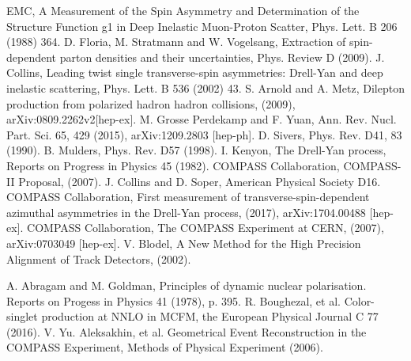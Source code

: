 \begin{thebibliography}{99}

  
 EMC, A Measurement of the Spin Asymmetry and
  Determination of the Structure Function g1 in Deep Inelastic
  Muon-Proton Scatter, Phys. Lett. B 206 (1988) 364.
 D. Floria, M. Stratmann and
  W. Vogelsang, Extraction of spin-dependent parton densities and
  their uncertainties, Phys. Review D (2009).
 J. Collins, Leading twist single
  transverse-spin asymmetries: Drell-Yan and deep inelastic
  scattering, Phys. Lett. B 536 (2002) 43.
 S. Arnold and A. Metz, Dilepton production from
  polarized hadron hadron collisions, (2009),
  arXiv:0809.2262v2[hep-ex].
 M. Grosse Perdekamp and F. Yuan,
  Ann. Rev. Nucl. Part. Sci. 65, 429 (2015), arXiv:1209.2803 [hep-ph].
 D. Sivers, Phys. Rev. D41, 83 (1990).
 B. Mulders, Phys. Rev. D57 (1998).
 I. Kenyon, The Drell-Yan process, Reports on
  Progress in Physics 45 (1982).
 COMPASS Collaboration, COMPASS-II Proposal, (2007).
 J. Collins and D. Soper, American Physical
  Society D16.
 COMPASS Collaboration, First measurement of
  transverse-spin-dependent azimuthal asymmetries in the Drell-Yan
  process, (2017), arXiv:1704.00488 [hep-ex].
 COMPASS Collaboration, The COMPASS Experiment at
  CERN, (2007), arXiv:0703049 [hep-ex].
 V. Blodel, A New Method for the High Precision
  Alignment of Track Detectors, (2002).

 A. Abragam and M. Goldman, Principles of dynamic nuclear
  polarisation. Reports on Progess in Physics 41 (1978), p. 395.  
 R. Boughezal, et al. Color-singlet production at NNLO in MCFM,
  the European Physical Journal C 77 (2016).
 V. Yu. Aleksakhin, et al. Geometrical Event Reconstruction in
  the COMPASS Experiment, Methods of Physical Experiment (2006).
  
\end{thebibliography}
